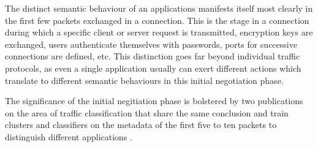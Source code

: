\documentclass[a4paper,12pt,twoside]{report}
\begin{document}
The distinct semantic behaviour of an applications manifests itself most clearly in the first few packets exchanged in a connection. This is the stage in a connection during which a specific client or server request is transmitted, encryption keys are exchanged, users authenticate themselves with passwords, ports for successive connections are defined, etc. This distinction goes far beyond individual traffic protocols, as even a single application usually can exert different actions which translate to different semantic behaviours in this initial negotiation phase. 

The significance of the initial negitiation phase is bolstered by two publications on the area of traffic classification that share the same conclusion and train clusters and classifiers on the metadata of the first five to ten packets to distinguish different applications \cite{bernaille2006traffic,crotti2007traffic}.
\end{document}
